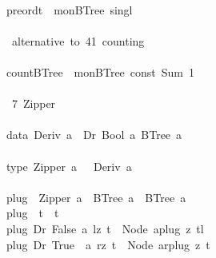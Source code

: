 \documentclass[a4paper]{article}
\begin{document}
\begin{tabbing}
\ttfamily ~\\
\ttfamily ~preordt~~monBTree~singl\\
\ttfamily ~\\
\ttfamily ~~alternative~to~41~counting~\\
\ttfamily ~\\
\ttfamily ~countBTree~~monBTree~const~Sum~1\\
\ttfamily ~\\
\ttfamily ~~7~Zipper~\\
\ttfamily ~\\
\ttfamily ~data~Deriv~a~~Dr~Bool~a~BTree~a\\
\ttfamily ~\\
\ttfamily ~type~Zipper~a~~~Deriv~a~\\
\ttfamily ~\\
\ttfamily ~plug~~Zipper~a~~BTree~a~~BTree~a\\
\ttfamily ~plug~~t~~t\\
\ttfamily ~plug~Dr~False~a~lz~t~~Node~aplug~z~tl\\
\ttfamily ~plug~Dr~True~~a~rz~t~~Node~arplug~z~t\\

\end{tabbing}
\end{document}
